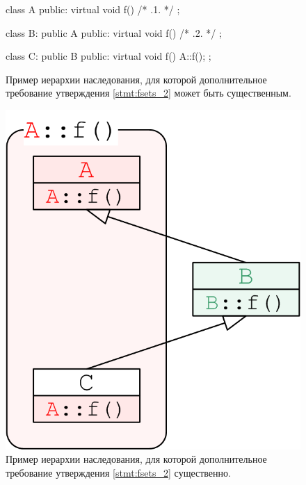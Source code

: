 \begin{figure}[htb!]
\hspace{2cm}
\begin{minipage}[b]{1cm}
\begin{cplusplus}
class A {
public:
    virtual void f() { /* .1. */ }
};

class B: public A {
public:
    virtual void f() { /* .2. */ }
};

class C: public B {
public:
    virtual void f() { A::f(); }
};
\end{cplusplus}
\end{minipage}
\caption{Пример иерархии наследования, для которой дополнительное требование утверждения \ref{stmt:fsets_2} может быть существенным.}
\label{listing:fset_failure}
\end{figure}

\begin{figure}[htb!]
\centering
\includegraphics[scale=1.0]{images/fset_failure.png}
\caption{Пример иерархии наследования, для которой дополнительное требование утверждения \ref{stmt:fsets_2} существенно.}
\label{fig:fset_failure}
\end{figure}

